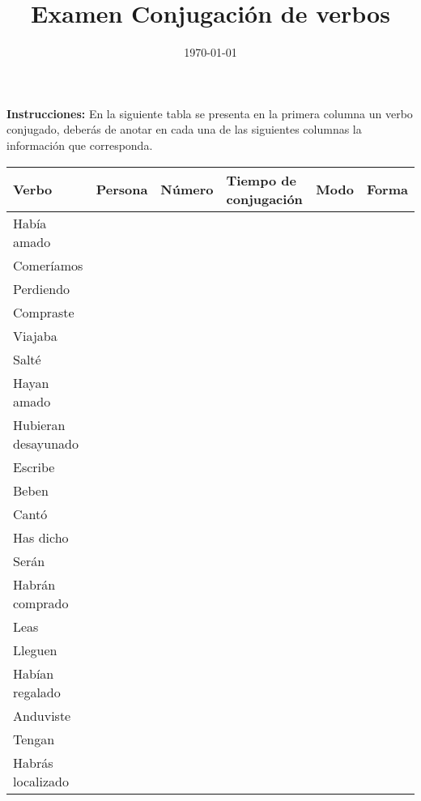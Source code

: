 
\title{\vspace*{-2cm}Examen Conjugación de verbos\vspace{-5ex}}
\date{\today}

\maketitle

\textbf{Instrucciones:} En la siguiente tabla se presenta en la primera columna un verbo conjugado, deberás de anotar en cada una de las siguientes columnas la información que corresponda.
\begin{table}[H]
\renewcommand{\arraystretch}{1.5}
\centering
\begin{tabular}{| l | l | l | l | p{1.5cm} | p{1.5cm} |} \hline
Verbo & Persona & Número & Tiempo de conjugación & Modo & Forma \\ \hline
Había amado & & & & & \\ \hline    
Comeríamos & & & & & \\ \hline    
Perdiendo & & & & & \\ \hline    
Compraste & & & & & \\ \hline    
Viajaba & & & & & \\ \hline    
Salté & & & & & \\ \hline    
Hayan amado & & & & & \\ \hline    
Hubieran desayunado & & & & & \\ \hline    
Escribe & & & & & \\ \hline    
Beben & & & & & \\ \hline    
Cantó & & & & & \\ \hline    
Has dicho & & & & & \\ \hline    
Serán & & & & & \\ \hline    
Habrán comprado & & & & & \\ \hline    
Leas & & & & & \\ \hline    
Lleguen & & & & & \\ \hline    
Habían regalado & & & & & \\ \hline    
Anduviste & & & & & \\ \hline    
Tengan & & & & & \\ \hline    
Habrás localizado & & & & & \\ \hline    
\end{tabular}
\end{table}

\newpage


